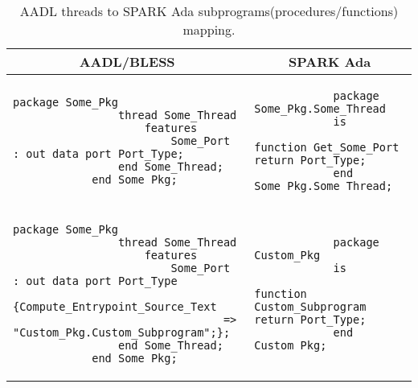\begin{table}[!ht]
	\caption{AADL threads to SPARK Ada subprograms(procedures/functions) mapping.}
	\label{table:threads2subprograms}
	\centering
  	\begin{tabular}{ | p{3.5in} | p{2.5in} |}

		\hline
		\multicolumn{1}{|c|}{\textbf{AADL/BLESS}} & \multicolumn{1}{|c|}{\textbf{SPARK Ada}} \\ \hline

		\begin{lstlisting}[language=aadl]
			package Some_Pkg
				thread Some_Thread
					features
						Some_Port : out data port Port_Type;
				end Some_Thread;
			end Some_Pkg;
		\end{lstlisting} 
		& 
		\begin{lstlisting}
			package Some_Pkg.Some_Thread
			is
				function Get_Some_Port return Port_Type;
			end Some_Pkg.Some_Thread;
		\end{lstlisting} 

		\\ \hline

		\begin{lstlisting}[language=aadl]
			package Some_Pkg
				thread Some_Thread
					features
						Some_Port : out data port Port_Type
							{Compute_Entrypoint_Source_Text 
								=> "Custom_Pkg.Custom_Subprogram";};
				end Some_Thread;
			end Some_Pkg;
		\end{lstlisting} 
		& 
		\begin{lstlisting}
			package Custom_Pkg
			is
				function Custom_Subprogram return Port_Type;
			end Custom_Pkg;

		\end{lstlisting} 

		\\ \hline
	\end{tabular}
\end{table}

